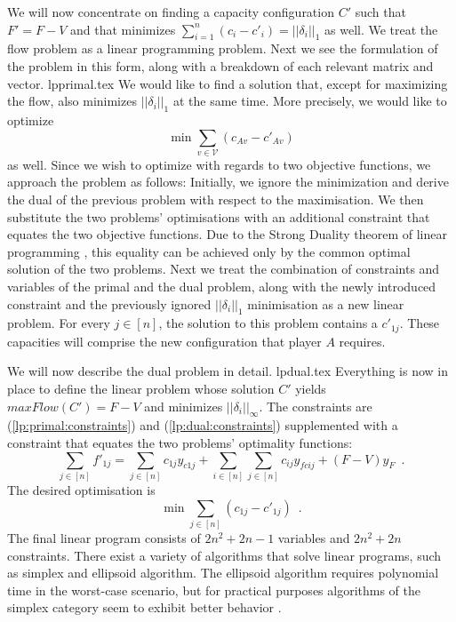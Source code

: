   We will now concentrate on finding a capacity configuration $C'$ such that $F' = F - V$ and that minimizes
  $\sum\limits_{i=1}^{n}\left(c_i-c'_i\right) = ||\delta_i||_1$ as well. We treat the flow problem as a linear programming
  problem. Next we see the formulation of the problem in this form, along with a breakdown of each relevant matrix and
  vector.
  {lpprimal.tex}
  We would like to find a solution that, except for maximizing the flow, also minimizes $||\delta_i||_1$ at the same time.
  More precisely, we would like to optimize
  \begin{equation*}
    \min{\sum\limits_{v \in \mathcal{V}}\left(c_{Av} - c'_{Av}\right)}
  \end{equation*}
  as well.
  Since we wish to optimize with regards to two objective functions, we approach the problem as follows: Initially, we ignore
  the minimization and derive the dual of the previous problem with respect to the maximisation. We then substitute the two
  problems' optimisations with an additional constraint that equates the two objective functions. Due to the Strong Duality
  theorem of linear programming \cite{amo}, this equality can be achieved only by the common optimal solution of the
  two problems. Next we treat the combination of constraints and variables of the primal and the dual problem, along with the
  newly introduced constraint and the previously ignored $||\delta_i||_1$ minimisation as a new linear problem. For every
  $j \in \left[n\right]$, the solution to this problem contains a $c'_{1j}$. These capacities will comprise the new
  configuration that player $A$ requires.

  We will now describe the dual problem in detail.
  {lpdual.tex}
  Everything is now in place to define the linear problem whose solution $C'$ yields $maxFlow\left(C'\right) = F - V$ and
  minimizes $||\delta_i||_\infty$. The constraints are (\ref{lp:primal:constraints}) and (\ref{lp:dual:constraints})
  supplemented with a constraint that equates the two problems' optimality functions:
  \begin{equation*}
    \sum\limits_{j \in \left[n\right]}f'_{1j} = \sum\limits_{j \in \left[n\right]}c_{1j}y_{c1j} +
    \sum\limits_{i \in \left[n\right]}\sum\limits_{j \in \left[n\right]}c_{ij}y_{fcij} + \left(F - V\right)y_F \enspace.
  \end{equation*}
  The desired optimisation is
  \begin{equation*}
    \min{\sum\limits_{j \in \left[n\right]}\left(c_{1j} - c'_{1j}\right)} \enspace.
  \end{equation*}
  The final linear program consists of $2n^2 + 2n - 1$ variables and $2n^2 + 2n$ constraints. There exist a variety of
  algorithms that solve linear programs, such as simplex and ellipsoid algorithm. The ellipsoid algorithm requires polynomial
  time in the worst-case scenario, but for practical purposes algorithms of the simplex category seem to exhibit better
  behavior \cite{it}.
